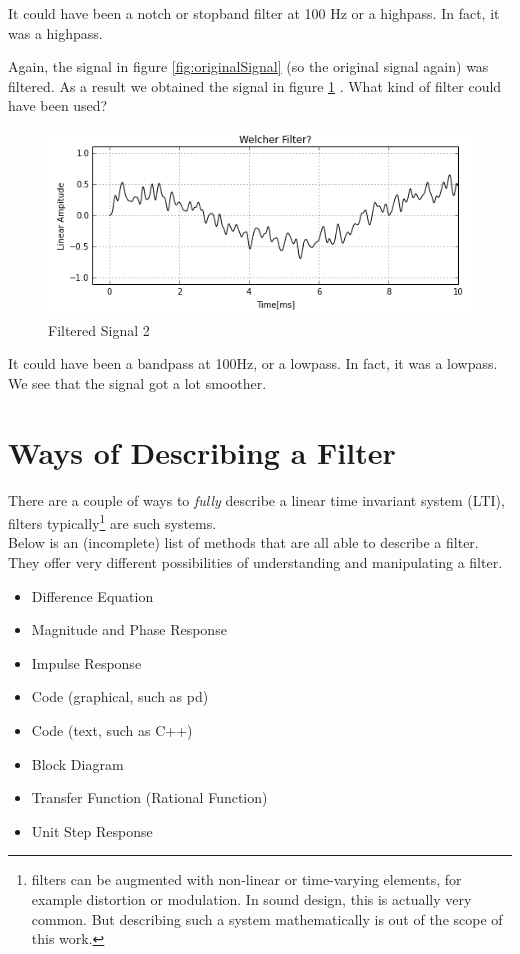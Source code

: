 \begin{Answer}
	It could have been a notch or stopband filter at 100 Hz or a highpass. In fact, it was a highpass.
\end{Answer}


\begin{question}
	Again, the signal in figure \ref{fig:originalSignal} (so the original signal again) was filtered. As a result we obtained the signal in figure \ref{fig:raetsel_2} . What kind of filter could have been used?
\begin{figure}[H]
	\begin{center}
		\includegraphics[width = 14cm]{raetsel_lowpass.png}
		\caption{Filtered Signal 2}
		\label{fig:raetsel_2}
	\end{center}
\end{figure}

\end{question}


\begin{Answer}
	It could have been a bandpass at 100Hz, or a lowpass. In fact, it was a lowpass. We see that the signal got a lot smoother.
\end{Answer}

\section{Ways of Describing a Filter}
There are a couple of ways to \textit{fully} describe a linear time invariant system (LTI), filters typically\footnote{filters can be augmented with non-linear or time-varying elements, for example distortion or modulation. In sound design, this is actually very common. But describing such a system mathematically is out of the scope of this work.} are such systems.\\
Below is an (incomplete) list of methods that are all able to describe a filter. They offer very different possibilities of understanding and manipulating a filter.
\begin{itemize}
	\item Difference Equation
	\item Magnitude and Phase Response
	\item Impulse Response
	\item Code (graphical, such as pd)
	\item Code (text, such as C++)
	\item Block Diagram
	\item Transfer Function (Rational Function)
	\item Unit Step Response
\end{itemize}


